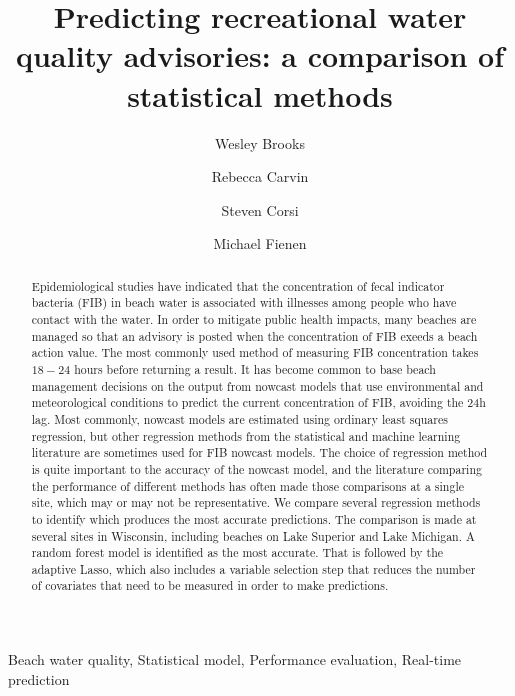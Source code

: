 \documentclass[authoryear,review, 12pt]{elsarticle}
\date{}
\begin{document}
\begin{frontmatter}

\title{Predicting recreational water quality advisories: a comparison of statistical methods}

\author[usgs-wiwsc]{Wesley Brooks}

\author[usgs-wiwsc]{Rebecca Carvin}

\author[usgs-wiwsc]{Steven Corsi}

\author[usgs-wiwsc]{Michael Fienen}

\address[usgs-wiwsc]{Wisconsin Water Science Center, United States Geological Survey, 8505 Research Way, Middleton, WI 53562}

\begin{abstract}
Epidemiological studies have indicated that the concentration of fecal indicator bacteria (FIB) in beach water is associated with illnesses among people who have contact with the water. In order to mitigate public health impacts, many beaches are managed so that an advisory is posted when the concentration of FIB exeeds a beach action value. The most commonly used method of measuring FIB concentration takes $18 - 24$ hours before returning a result. It has become common to base beach management decisions on the output from nowcast models that use environmental and meteorological conditions to predict the current concentration of FIB, avoiding the 24h lag. Most commonly, nowcast models are estimated using ordinary least squares regression, but other regression methods from the statistical and machine learning literature are sometimes used for FIB nowcast models. The choice of regression method is quite important to the accuracy of the nowcast model, and the literature comparing the performance of different methods has often made those comparisons at a single site, which may or may not be representative. We compare several regression methods to identify which produces the most accurate predictions. The comparison is made at several sites in Wisconsin, including beaches on Lake Superior and Lake Michigan. A random forest model is identified as the most accurate. That is followed by the adaptive Lasso, which also includes a variable selection step that reduces the number of covariates that need to be measured in order to make predictions.
\end{abstract}

\begin{keyword}
Beach water quality, Statistical model, Performance evaluation, Real-time prediction
\end{keyword}

\end{frontmatter}
\end{document}
